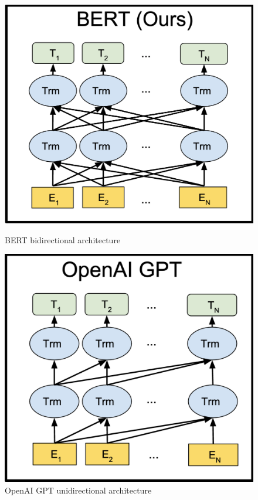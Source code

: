 \begin{figure}[h]
    \centering
    \begin{minipage}[b]{0.40\textwidth}
        \centering
        \includegraphics[width=\textwidth]{figures/bert.png}
        \caption{BERT bidirectional architecture}
        \label{fig:bert}
    \end{minipage}
    \hfill
    \begin{minipage}[b]{0.39\textwidth}
        \centering
        \includegraphics[width=\textwidth]{figures/openai.png}
        \caption{OpenAI GPT unidirectional architecture}
        \label{fig:gpt}
    \end{minipage}
\end{figure}

